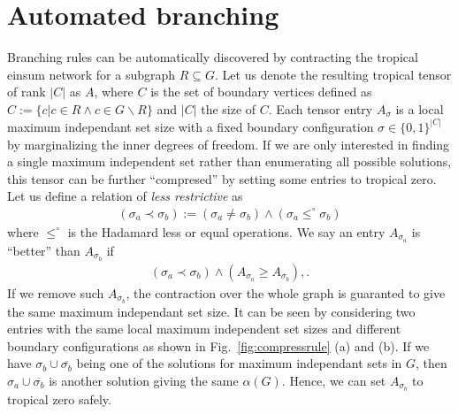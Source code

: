 \documentclass{article}
\newcommand{\<}{\langle}
\renewcommand{\>}{\rangle}
\newcommand{\Fig}[1]{Fig.~\ref{#1}}
\theoremstyle{definition}\newtheorem{definition}{\textit{Definition}}
\begin{document}
\section{Automated branching}
Branching rules can be automatically discovered by contracting the tropical einsum network for a subgraph $R \subseteq G$.
Let us denote the resulting tropical tensor of rank $|C|$ as $A$, where $C$ is the set of boundary vertices defined as $C := \{c | c\in R \land c \in G\backslash R\}$ and $|C|$ the size of $C$.
Each tensor entry $A_{\sigma}$ is a local maximum independant set size with a fixed boundary configuration $\sigma \in \{0,1\}^{|C|}$ by marginalizing the inner degrees of freedom.
If we are only interested in finding a single maximum independent set rather than enumerating all possible solutions,
this tensor can be further ``compresed'' by setting some entries to tropical zero.
Let us define a relation of \textit{less restrictive} as
\begin{align}
(\sigma_a \prec \sigma_b) := (\sigma_a \neq \sigma_b) \land (\sigma_a \leq^\circ \sigma_b)
\end{align}
where $\leq^\circ$ is the Hadamard less or equal operations.
We say an entry $A_{\sigma_a}$ is ``better'' than $A_{\sigma_b}$ if
\begin{align}
(\sigma_a \prec \sigma_b) \land (A_{\sigma_a} \geq A_{\sigma_b}),\label{eq:compress}.
\end{align}
If we remove such $A_{\sigma_b}$, the contraction over the whole graph is guaranted to give the same maximum independant set size.
It can be seen by considering two entries with the same local maximum independent set sizes and different boundary configurations as shown in \Fig{fig:compressrule} (a) and (b).
If we have $\sigma_b \cup \overline{\sigma_b}$ being one of the solutions for maximum independant sets in $G$, then $\sigma_a \cup \overline{\sigma_b}$ is another solution giving the same $\alpha(G)$.
Hence, we can set $A_{\sigma_b}$ to tropical zero safely.
\end{document}
